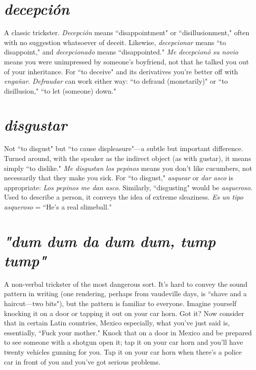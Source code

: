 \section{\emph{decepción}}

A classic trickster. \emph{Decepción} means ``disappointment" or ``disillusionment," often with no suggestion whatsoever
of deceit. Likewise, \emph{decepcionar} means ``to disappoint," and \emph{decepcionado} means ``disappointed." \emph{Me decepcionó su novio} means you
were unimpressed by someone's boyfriend, not that he talked you out
of your inheritance. For ``to deceive" and its derivatives you're better
off with \emph{engañar}. \emph{Defraudar} can work either way: ``to defraud (monetarily)" or ``to disillusion," ``to let (someone) down."

\section{\emph{disgustar}}

Not ``to disgust" but ``to cause displeasure"---a
subtle but important difference. Turned around, with the speaker as
the indirect object (as with gustar), it means simply ``to dislike." \emph{Me
	disgustan los pepinos} means you don't like cucumbers, not necessarily
that they make you sick. For ``to disgust," \emph{asquear} or \emph{dar asco} is appropriate: \emph{Los pepinos me dan asco}. Similarly, ``disgusting" would be
\emph{asqueroso}. Used to describe a person, it conveys the idea of extreme
sleaziness. \emph{Es un tipo asqueroso} = ``He's a real slimeball."

\section{\emph{"dum dum da dum dum, tump tump"}}

A non-verbal trickster of the most dangerous sort. It's hard to convey the sound pattern
in writing (one rendering, perhaps from vaudeville days, is ``shave and
a haircut---two bits"), but the pattern is familiar to everyone. Imagine
yourself knocking it on a door or tapping it out on your car horn. Got
it? Now consider that in certain Latin countries, Mexico especially,
what you've just said is, essentially, ``Fuck your mother." Knock that
on a door in Mexico and be prepared to see someone with a shotgun
open it; tap it on your car horn and you'll have twenty vehicles gunning for you. Tap it on your car horn when there's a police car in front
of you and you've got serious problems.

